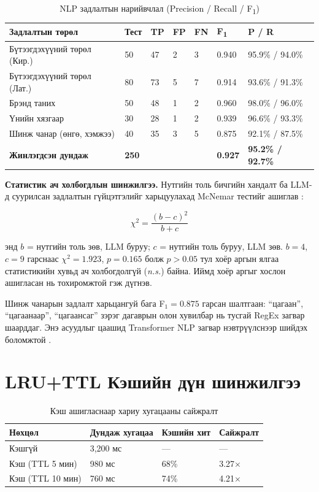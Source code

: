 \documentclass[12pt,a4paper]{report}
\begin{document}
\begin{table}[H]
\centering
\caption{NLP задлалтын нарийвчлал (Precision / Recall / F\textsubscript{1})}
\label{tab:nlp_accuracy}
\begin{tabularx}{\textwidth}{@{}lXXXXXX@{}}
\toprule
\textbf{Задлалтын төрөл} & \textbf{Тест} & \textbf{TP} & \textbf{FP} & \textbf{FN} & \textbf{F\textsubscript{1}} & \textbf{P / R} \\
\midrule
Бүтээгдэхүүний төрөл (Кир.) & 50 & 47 & 2 & 3 & 0.940 & 95.9\% / 94.0\% \\
Бүтээгдэхүүний төрөл (Лат.) & 80 & 73 & 5 & 7 & 0.914 & 93.6\% / 91.3\% \\
Брэнд таних & 50 & 48 & 1 & 2 & 0.960 & 98.0\% / 96.0\% \\
Үнийн хязгаар & 30 & 28 & 1 & 2 & 0.939 & 96.6\% / 93.3\% \\
Шинж чанар (өнгө, хэмжээ) & 40 & 35 & 3 & 5 & 0.875 & 92.1\% / 87.5\% \\
\midrule
\textbf{Жинлэгдсэн дундаж} & \textbf{250} & & & & \textbf{0.927} & \textbf{95.2\% / 92.7\%} \\
\bottomrule
\end{tabularx}
\end{table}

\textbf{Статистик ач холбогдлын шинжилгээ.} Нутгийн толь бичгийн хандалт ба LLM-д суурилсан задлалтын гүйцэтгэлийг харьцуулахад McNemar тестийг ашиглав \cite{mcnemar1947}:

\begin{equation}
\chi^2 = \frac{(b - c)^2}{b + c}
\label{eq:mcnemar}
\end{equation}

\noindent энд $b$ = нутгийн толь зөв, LLM буруу; $c$ = нутгийн толь буруу, LLM зөв. $b=4$, $c=9$ гарснаас $\chi^2 = 1.923$, $p = 0.165$ болж $p > 0.05$ тул хоёр аргын ялгаа статистикийн хувьд ач холбогдолгүй (\textit{n.s.}) байна. Иймд хоёр аргыг хослон ашигласан нь тохиромжтой гэж дүгнэв.

Шинж чанарын задлалт харьцангуй бага F$_1 = 0.875$ гарсан шалтгаан: ``цагаан'', ``цагаанаар'', ``цагаансаг'' зэрэг дагаврын олон хувилбар нь тусгай RegEx загвар шаарддаг. Энэ асуудлыг цаашид Transformer NLP загвар нэвтрүүлснээр шийдэх боломжтой \cite{devlin2018bert}.

\section{LRU+TTL Кэшийн дүн шинжилгээ}

\begin{table}[H]
\centering
\caption{Кэш ашигласнаар хариу хугацааны сайжралт}
\label{tab:cache_perf}
\begin{tabularx}{\textwidth}{@{}lXXX@{}}
\toprule
\textbf{Нөхцөл} & \textbf{Дундаж хугацаа} & \textbf{Кэшийн хит} & \textbf{Сайжралт} \\
\midrule
Кэшгүй & 3,200 мс & --- & --- \\
Кэш (TTL 5 мин) & 980 мс & 68\% & 3.27$\times$ \\
Кэш (TTL 10 мин) & 760 мс & 74\% & 4.21$\times$ \\
\bottomrule
\end{tabularx}
\end{table}
\end{document}
